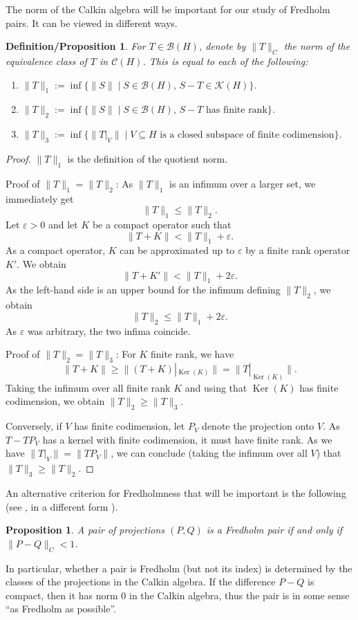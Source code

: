 \documentclass[10pt,a4paper]{amsart}
\numberwithin{equation}{section}
\newtheorem{Proposition}[Theorem]{Proposition}
\newtheorem{defprop}[Theorem]{Definition/Proposition}
\DeclareMathOperator{\Ker}{Ker}
\begin{document}
The norm of the Calkin algebra will be important for our study of Fredholm pairs. It can be viewed in different ways.
	\begin{defprop}		\label {cnorm}
		For $T\in\mathcal{B}(H)$, denote by $\|T\|_C$ the norm of the equivalence class of $T$ in $\mathcal{C}(H)$. This is equal to each of the following:
		\begin{enumerate}\itemsep=0pt
			\item[$(1)$] %
            $\|T\|_1:=\inf\{\|S\| \mid S\in\mathcal{B}(H),\, S-T\in\mathcal{K}(H)\}$.
			\item[$(2)$] %
            $\|T\|_2:=\inf\{\|S\| \mid S\in\mathcal{B}(H),\, S-T\text{ has finite rank}\}$.
			\item[$(3)$] %
            $\|T\|_3:=\inf\{\|T|_V\|\mid V\subseteq H \text{ is a closed subspace of finite codimension}\}$.
		\end{enumerate}
	\end{defprop}
	\begin{proof}
		$\|T\|_1$ is the definition of the quotient norm.
		
		Proof of $\|T\|_1=\|T\|_2$:
				As $\|T\|_1$ is an infimum over a larger set, we immediately get
		\[\|T\|_1\leq\|T\|_2.\]
		Let $\varepsilon>0$ and let $K$ be a compact operator such that \[\|T+K\|<\|T\|_1+\varepsilon.\] As a compact operator, $K$ can be approximated up to $\varepsilon$ by a finite rank operator $K'$. We obtain
		\[\bigl\|T+K'\bigr\|<\|T\|_1+2\varepsilon.\]
		As the left-hand side is an upper bound for the infimum defining $\|T\|_2$, we obtain
		\[\|T\|_2\leq \|T\|_1+2\varepsilon.\]
		As $\varepsilon$ was arbitrary, the two infima coincide.
		
		Proof of $\|T\|_2=\|T\|_3$:
For $K$ finite rank, we have
        \[
        \|T+K\|\geq \bigl\|(T+K)|_{\Ker(K)}\bigr\|= \bigl\|T|_{\Ker(K)}\bigr\|.
        \]
        Taking the infimum over all finite rank $K$ and using that $\Ker(K)$ has finite codimension, we obtain $\|T\|_2\geq\|T\|_3$.
		
		Conversely, if $V$ has finite codimension, let $P_V$ denote the projection onto $V$. As $T-TP_V$ has a kernel with finite codimension,  it must have finite rank. As we have $\|T|_V\|=\|TP_V\|$, we can conclude (taking the infimum over all $V$) that  $\|T\|_3\geq\|T\|_2$.
	\end{proof}

	An alternative criterion for Fredholmness that will be important is the following (see \cite[Corollary~5.3.14]{DSW}, in a different form \cite[Proposition~3.2]{ASS}).
	\begin{Proposition}
		\label{FredDiff}
		A pair of projections $(P,Q)$ is a Fredholm pair if and only if
		$\|P-Q\|_C<1$.
	\end{Proposition}
	In particular, whether a pair is Fredholm (but not its index) is determined by the classes of the projections in the Calkin algebra. If the difference $P-Q$ is compact, then it has norm $0$ in the Calkin algebra, thus the pair is in some sense ``as Fredholm as possible''.
\end{document}
